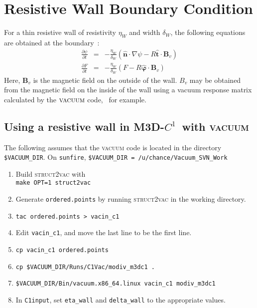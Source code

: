 \documentclass[letterpaper]{book}
\newcommand{\ddt}[1]{\frac{\partial #1}{\partial t}}
\renewcommand{\vec}[1]{\ensuremath{\mathbf{#1}}}
\newcommand{\tor}{\varphi}              %
\newcommand{\B}{\vec{B}}
\newcommand{\codename}{\textsc{M3D-$C^1$}}
\newcommand{\grad}[1]{\nabla #1}
\newcommand{\uvec}[1]{\ensuremath{\vec{\hat{#1}}}}
\begin{document}
\section{Resistive Wall Boundary Condition}

For a thin resistive wall of resistivity $\eta_W$ and width
$\delta_W$, the following equations are obtained at the
boundary~\cite{Jardin10}:
\begin{eqnarray}
  \ddt{\psi} & = & -\frac{\eta_W}{\delta_W} \left(\uvec{n} \cdot
  \grad{\psi} - R \uvec{t} \cdot \B_v \right)
    \\
  \ddt{F} & = & -\frac{\eta_W}{\delta_W} \left(F - R \uvec{\tor} \cdot
  \B_v \right)
\end{eqnarray}
Here, $\B_v$ is the magnetic field on the outside of the wall.  $B_v$
may be obtained from the magnetic field on the inside of the wall
using a vacuum response matrix calculated by the $\textsc{vacuum}$
code,~\cite{Chance10} for example.

\subsection{Using a resistive wall in \codename\ with \textsc{vacuum}}

The following assumes that the \textsc{vacuum} code is located in the
directory \texttt{\$VACUUM\_DIR}.  On \texttt{sunfire},
\texttt{\$VACUUM\_DIR = /u/chance/Vacuum\_SVN\_Work}

\begin{enumerate}
\item Build \textsc{struct2vac} with\\
  \texttt{make OPT=1 struct2vac}
\item Generate \texttt{ordered.points} by running \textsc{struct2vac}
  in the working directory.
\item \texttt{tac ordered.points > vacin\_c1}
\item Edit \texttt{vacin\_c1}, and move the last line to be the first
  line.
\item \texttt{cp vacin\_c1 ordered.points}
\item \texttt{cp \$VACUUM\_DIR/Runs/C1Vac/modiv\_m3dc1 .}
\item \texttt{\$VACUUM\_DIR/Bin/vacuum.x86\_64.linux vacin\_c1 modiv\_m3dc1}
\item In \texttt{C1input}, set \texttt{eta\_wall} and
  \texttt{delta\_wall} to the appropriate values.
\end{enumerate}
\end{document}
